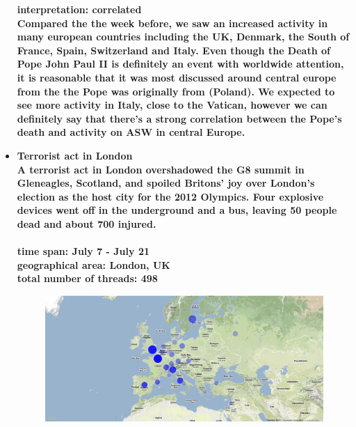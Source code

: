 \documentclass[11pt,a4paper,english]{article}
\begin{document}
\begin{itemize}
					\bf interpretation: \rm correlated
					\\ Compared the the week before, we saw an increased activity in many european countries including the UK, Denmark, the South of France, Spain, Switzerland and Italy. Even though the Death of Pope John Paul II is definitely an event with worldwide attention, it is reasonable that it was most discussed around central europe from the the Pope was originally from (Poland). We expected to see more activity in Italy, close to the Vatican, however we can definitely say that there's a strong correlation between the Pope's death and activity on ASW in central Europe.
						


				\item \bf Terrorist act in London \rm
					\\ A terrorist act in London overshadowed the G8 summit in Gleneagles, Scotland, and spoiled Britons' joy over London's election as the host city for the 2012 Olympics. Four explosive devices went off in the underground and a bus, leaving 50 people dead and about 700 injured.
					\\\\ \bf time span: \rm July 7 - July 21
					\\ \bf geographical area: \rm London, UK
					\\ \bf total number of threads: \rm 498
					\begin{figure}[H]
						\vspace{-10pt}
						\begin{center}
							\includegraphics[width=130mm]{img/pre-london}
						\end{center}
						\vspace{-13pt}
					\end{figure}
					\begin{figure}[H]
						\vspace{-10pt}
  						\begin{center}

\end{center}
\end{figure}
\end{itemize}
\end{document}
